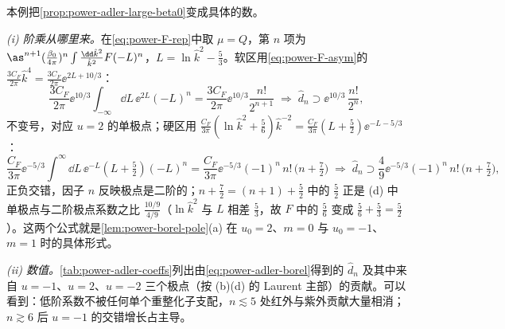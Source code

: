 
\begin{example}[带 $n$ 个费米子泡的单胶子]\label{ex:power-renormalon-chain}
本例把\cref{prop:power-adler-large-beta0}变成具体的数。

\emph{(i) 阶乘从哪里来。}在\eqref{eq:power-F-rep}中取 $\mu=Q$，第 $n$ 项为 $\as^{n+1}(\frac{\beta_0}{4\pi})^n\int\frac{\dd\hat k^2}{\hat k^2}F(-L)^n$，$L=\ln\hat k^2-\frac53$。软区用\eqref{eq:power-F-asym}的 $\frac{3C_F}{2\pi}\hat k^4=\frac{3C_F}{2\pi}\ee^{2L+10/3}$：
\begin{equation*}
\frac{3C_F}{2\pi}\ee^{10/3}\int_{-\infty}\!\dd L\,\ee^{2L}(-L)^n=\frac{3C_F}{2\pi}\ee^{10/3}\frac{n!}{2^{n+1}}
\;\Longrightarrow\;\hat d_n\supset\ee^{10/3}\,\frac{n!}{2^n},
\end{equation*}
不变号，对应 $u=2$ 的单极点；硬区用 $\frac{C_F}{3\pi}(\ln\hat k^2+\frac56)\hat k^{-2}=\frac{C_F}{3\pi}(L+\frac52)\ee^{-L-5/3}$：
\begin{equation*}
\frac{C_F}{3\pi}\ee^{-5/3}\int^{\infty}\!\dd L\,\ee^{-L}(L+\tfrac52)(-L)^n=\frac{C_F}{3\pi}\ee^{-5/3}(-1)^n\,n!\,\big(n+\tfrac72\big)
\;\Longrightarrow\;\hat d_n\supset\frac49\ee^{-5/3}(-1)^n\,n!\,\big(n+\tfrac72\big),
\end{equation*}
正负交错，因子 $n$ 反映极点是二阶的；$n+\frac72=(n+1)+\frac52$ 中的 $\frac52$ 正是 (d) 中单极点与二阶极点系数之比 $\frac{10/9}{4/9}$（$\ln\hat k^2$ 与 $L$ 相差 $\frac53$，故 $F$ 中的 $\frac56$ 变成 $\frac56+\frac53=\frac52$）。这两个公式就是\cref{lem:power-borel-pole}(a) 在 $u_0=2$、$m=0$ 与 $u_0=-1$、$m=1$ 时的具体形式。

\emph{(ii) 数值。}\cref{tab:power-adler-coeffs}列出由\eqref{eq:power-adler-borel}得到的 $\hat d_n$ 及其中来自 $u=-1$、$u=2$、$u=-2$ 三个极点（按 (b)(d) 的 Laurent 主部）的贡献。可以看到：低阶系数不被任何单个重整化子支配，$n\lesssim5$ 处红外与紫外贡献大量相消；$n\gtrsim6$ 后 $u=-1$ 的交错增长占主导。


\end{example}
